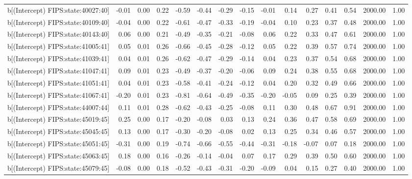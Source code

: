 \begin{table}[ht]
\begin{tabular}{rrrrrrrrrrrrrrr}
  b[(Intercept) FIPS:state:40027:40] & -0.01 & 0.00 & 0.22 & -0.59 & -0.44 & -0.29 & -0.15 & -0.01 & 0.14 & 0.27 & 0.41 & 0.54 & 2000.00 & 1.00 \\ 
  b[(Intercept) FIPS:state:40109:40] & -0.04 & 0.00 & 0.22 & -0.61 & -0.47 & -0.33 & -0.19 & -0.04 & 0.10 & 0.23 & 0.37 & 0.48 & 2000.00 & 1.00 \\ 
  b[(Intercept) FIPS:state:40143:40] & 0.06 & 0.00 & 0.21 & -0.49 & -0.35 & -0.21 & -0.08 & 0.06 & 0.22 & 0.33 & 0.47 & 0.61 & 2000.00 & 1.00 \\ 
  b[(Intercept) FIPS:state:41005:41] & 0.05 & 0.01 & 0.26 & -0.66 & -0.45 & -0.28 & -0.12 & 0.05 & 0.22 & 0.39 & 0.57 & 0.74 & 2000.00 & 1.00 \\ 
  b[(Intercept) FIPS:state:41039:41] & 0.04 & 0.01 & 0.26 & -0.62 & -0.47 & -0.29 & -0.14 & 0.04 & 0.23 & 0.37 & 0.54 & 0.68 & 2000.00 & 1.00 \\ 
  b[(Intercept) FIPS:state:41047:41] & 0.09 & 0.01 & 0.23 & -0.49 & -0.37 & -0.20 & -0.06 & 0.09 & 0.24 & 0.38 & 0.55 & 0.68 & 2000.00 & 1.00 \\ 
  b[(Intercept) FIPS:state:41051:41] & 0.04 & 0.01 & 0.23 & -0.58 & -0.41 & -0.24 & -0.12 & 0.04 & 0.20 & 0.32 & 0.49 & 0.66 & 2000.00 & 1.00 \\ 
  b[(Intercept) FIPS:state:41067:41] & -0.20 & 0.01 & 0.23 & -0.81 & -0.64 & -0.49 & -0.35 & -0.20 & -0.05 & 0.09 & 0.25 & 0.39 & 2000.00 & 1.00 \\ 
  b[(Intercept) FIPS:state:44007:44] & 0.11 & 0.01 & 0.28 & -0.62 & -0.43 & -0.25 & -0.08 & 0.11 & 0.30 & 0.48 & 0.67 & 0.91 & 2000.00 & 1.00 \\ 
  b[(Intercept) FIPS:state:45019:45] & 0.25 & 0.00 & 0.17 & -0.20 & -0.08 & 0.03 & 0.13 & 0.24 & 0.36 & 0.47 & 0.58 & 0.69 & 2000.00 & 1.00 \\ 
  b[(Intercept) FIPS:state:45045:45] & 0.13 & 0.00 & 0.17 & -0.30 & -0.20 & -0.08 & 0.02 & 0.13 & 0.25 & 0.34 & 0.46 & 0.57 & 2000.00 & 1.00 \\ 
  b[(Intercept) FIPS:state:45051:45] & -0.31 & 0.00 & 0.19 & -0.74 & -0.66 & -0.55 & -0.44 & -0.31 & -0.18 & -0.07 & 0.07 & 0.18 & 2000.00 & 1.00 \\ 
  b[(Intercept) FIPS:state:45063:45] & 0.18 & 0.00 & 0.16 & -0.26 & -0.14 & -0.04 & 0.07 & 0.17 & 0.29 & 0.39 & 0.50 & 0.60 & 2000.00 & 1.00 \\ 
  b[(Intercept) FIPS:state:45079:45] & -0.08 & 0.00 & 0.18 & -0.52 & -0.43 & -0.31 & -0.20 & -0.09 & 0.04 & 0.15 & 0.27 & 0.40 & 2000.00 & 1.00 \\ 

\end{tabular}
\end{table}
